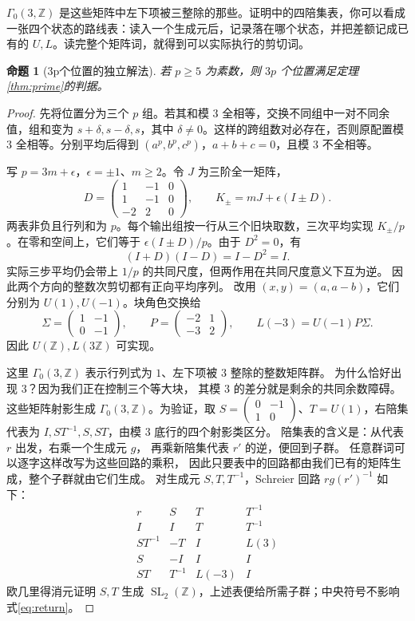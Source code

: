 \documentclass[11pt,a4paper,oneside,openany]{book}
\newcommand{\Z}{\mathbb Z}
\newcommand{\SL}{\operatorname{SL}}
\newtheorem{proposition}[theorem]{命题}
\theoremstyle{definition}
\numberwithin{equation}{chapter}
\begin{document}
$\Gamma_0(3,\Z)$ 是这些矩阵中左下项被三整除的那些。证明中的四陪集表，你可以看成一张四个状态的路线表：读入一个生成元后，记录落在哪个状态，并把差额记成已有的 $U,L$。读完整个矩阵词，就得到可以实际执行的剪切词。
\begin{proposition}[3p个位置的独立解法]\label{prop:threep}
若 $p\ge5$ 为素数，则 $3p$ 个位置满足定理\ref{thm:prime}的判据。
\end{proposition}
\begin{proof}
先将位置分为三个 $p$ 组。若其和模 $3$ 全相等，交换不同组中一对不同余值，组和变为 $s+\delta,s-\delta,s$，其中 $\delta\ne0$。这样的跨组数对必存在，否则原配置模 $3$ 全相等。分别平均后得到 $(a^p,b^p,c^p)$，$a+b+c=0$，且模 $3$ 不全相等。

写 $p=3m+\epsilon$，$\epsilon=\pm1$、$m\ge2$。令 $J$ 为三阶全一矩阵，
\[
D=\begin{pmatrix}1&-1&0\\1&-1&0\\-2&2&0\end{pmatrix},\qquad
K_\pm=mJ+\epsilon(I\pm D).
\]
两表非负且行列和为 $p$。每个输出组按一行从三个旧块取数，三次平均实现 $K_\pm/p$。在零和空间上，它们等于 $\epsilon(I\pm D)/p$。由于 $D^2=0$，有
\[
(I+D)(I-D)=I-D^2=I.
\]
实际三步平均仍会带上 $1/p$ 的共同尺度，但两作用在共同尺度意义下互为逆。
因此两个方向的整数次剪切都有正向平均序列。
改用 $(x,y)=(a,a-b)$，它们分别为 $U(1),U(-1)$。块角色交换给
\[
\Sigma=\begin{pmatrix}1&-1\\0&-1\end{pmatrix},\qquad
P=\begin{pmatrix}-2&1\\-3&2\end{pmatrix},\qquad
L(-3)=U(-1)P\Sigma.
\]
因此 $U(\Z),L(3\Z)$ 可实现。


这里 $\Gamma_0(3,\Z)$ 表示行列式为 $1$、左下项被 $3$ 整除的整数矩阵群。
为什么恰好出现 $3$？因为我们正在控制三个等大块，
其模 $3$ 的差分就是剩余的共同余数障碍。
这些矩阵射影生成 $\Gamma_0(3,\Z)$。为验证，取 $S=\left(\begin{smallmatrix}0&-1\\1&0\end{smallmatrix}\right)$、$T=U(1)$，右陪集代表为 $I,ST^{-1},S,ST$，由模 $3$ 底行的四个射影类区分。
陪集表的含义是：从代表 $r$ 出发，右乘一个生成元 $g$，
再乘新陪集代表 $r'$ 的逆，便回到子群。
任意群词可以逐字这样改写为这些回路的乘积，
因此只要表中的回路都由我们已有的矩阵生成，整个子群就由它们生成。
对生成元 $S,T,T^{-1}$，Schreier 回路 $rg(r')^{-1}$ 如下：
\[
\begin{array}{c|ccc}
r&S&T&T^{-1}\\\hline
I&I&T&T^{-1}\\
ST^{-1}&-T&I&L(3)\\
S&-I&I&I\\
ST&T^{-1}&L(-3)&I
\end{array}
\]
欧几里得消元证明 $S,T$ 生成 $\SL_2(\Z)$，上述表便给所需子群；中央符号不影响式\eqref{eq:return}。


\end{proof}
\end{document}
